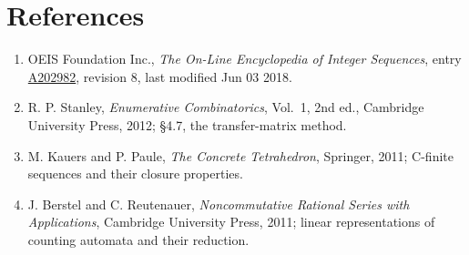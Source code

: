 \documentclass[11pt]{article}
\theoremstyle{definition}
\begin{document}
\section{References}

\begin{enumerate}

\item OEIS Foundation Inc., \emph{The On-Line Encyclopedia of Integer Sequences}, entry \href{https://oeis.org/A202982}{A202982}, revision 8, last modified Jun 03 2018.

\item R. P. Stanley, \emph{Enumerative Combinatorics}, Vol.~1, 2nd ed., Cambridge University Press, 2012; \S4.7, the transfer-matrix method.

\item M. Kauers and P. Paule, \emph{The Concrete Tetrahedron}, Springer, 2011; C-finite sequences and their closure properties.

\item J. Berstel and C. Reutenauer, \emph{Noncommutative Rational Series with Applications}, Cambridge University Press, 2011; linear representations of counting automata and their reduction.

\end{enumerate}
\end{document}
